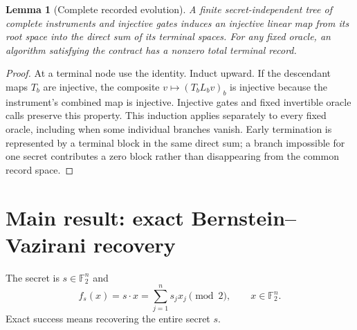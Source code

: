 \documentclass[11pt]{article}
\newtheorem{lemma}[theorem]{Lemma}
\newcommand{\F}{\mathbb F}
\begin{document}
\begin{lemma}[Complete recorded evolution]\label{lem:record}
A finite secret-independent tree of complete instruments and injective gates induces an injective linear map from its root space into the direct sum of its terminal spaces. For any fixed oracle, an algorithm satisfying the contract has a nonzero total terminal record.
\end{lemma}
\begin{proof}
At a terminal node use the identity. Induct upward. If the descendant maps $T_b$ are injective, the composite $v\mapsto(T_bL_bv)_b$ is injective because the instrument's combined map is injective. Injective gates and fixed invertible oracle calls preserve this property. This induction applies separately to every fixed oracle, including when some individual branches vanish. Early termination is represented by a terminal block in the same direct sum; a branch impossible for one secret contributes a zero block rather than disappearing from the common record space.
\end{proof}

\section{Main result: exact Bernstein--Vazirani recovery}\label{sec:bv}
The secret is $s\in\F_2^n$ and
\[
 f_s(x)=s\cdot x=\sum_{j=1}^n s_jx_j\pmod 2,
 \qquad x\in\F_2^n.
\]
Exact success means recovering the entire secret $s$.
\end{document}

